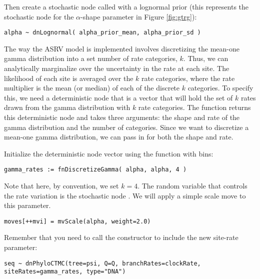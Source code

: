 Then create a stochastic node called  with a lognormal prior (this represents the stochastic node for the $\alpha$-shape parameter in Figure \ref{fig:gtrg}):
{\tt\begin{snugshade*}
\begin{lstlisting}
alpha ~ dnLognormal( alpha_prior_mean, alpha_prior_sd )
\end{lstlisting}
\end{snugshade*}}

The way the ASRV model is implemented involves discretizing the mean-one gamma distribution into a set number of rate categories, $k$. 
Thus, we can analytically marginalize over the uncertainty in the rate at each site. 
The likelihood of each site is averaged over the $k$ rate categories, where the rate multiplier is the mean (or median) of each of the discrete $k$ categories. 
To specify this, we need a deterministic node that is a vector that will hold the set of $k$ rates drawn from the gamma distribution with $k$ rate categories. 
The  function returns this deterministic node and takes three arguments: the shape and rate of the gamma distribution and the number of categories. 
Since we want to discretize a mean-one gamma distribution, we can pass in  for both the shape and rate.

Initialize the  deterministic node vector using the   function with  bins:
{\tt \begin{snugshade*}
\begin{lstlisting}
gamma_rates := fnDiscretizeGamma( alpha, alpha, 4 )
\end{lstlisting}
\end{snugshade*}}

Note that here, by convention, we set $k = 4$.
The random variable that controls the rate variation is the stochastic node . 
We will apply a simple scale move to this parameter.
{\tt \begin{snugshade*}
\begin{lstlisting}
moves[++mvi] = mvScale(alpha, weight=2.0)
\end{lstlisting}
\end{snugshade*}}

Remember that you need to call the  constructor to include the new site-rate parameter:
{\tt \begin{snugshade*}
\begin{lstlisting}
seq ~ dnPhyloCTMC(tree=psi, Q=Q, branchRates=clockRate, siteRates=gamma_rates, type="DNA")
\end{lstlisting}
\end{snugshade*}}



